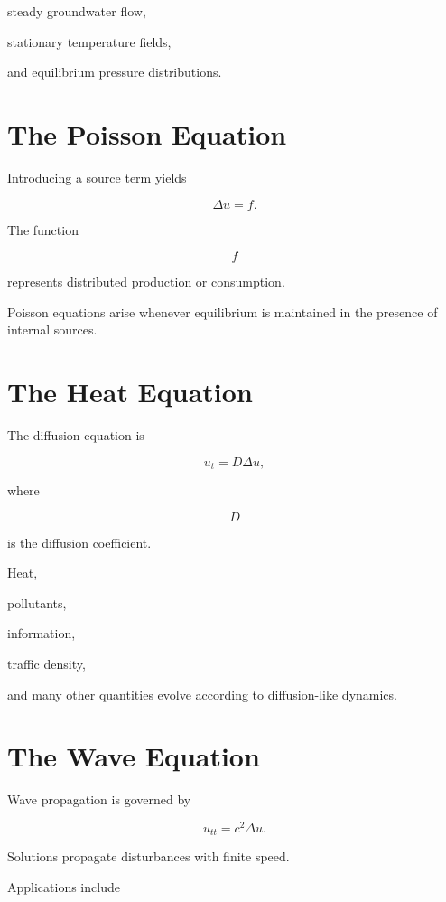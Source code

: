 \documentclass[11pt,fleqn]{book}
\numberwithin{equation}{chapter}
\theoremstyle{plain}
\theoremstyle{definition}
\theoremstyle{remark}
\begin{document}
steady groundwater flow,

stationary temperature fields,

and equilibrium pressure distributions.


\section{The Poisson Equation}

Introducing a source term yields

\[
\boxed{
\Delta u
=
f.
}
\]

The function

\[
f
\]

represents distributed production or consumption.

Poisson equations arise whenever equilibrium is maintained in the
presence of internal sources.


\section{The Heat Equation}

The diffusion equation is

\[
\boxed{
u_t
=
D
\Delta u,
}
\]

where

\[
D
\]

is the diffusion coefficient.

Heat,

pollutants,

information,

traffic density,

and many other quantities evolve according to diffusion-like dynamics.


\section{The Wave Equation}

Wave propagation is governed by

\[
\boxed{
u_{tt}
=
c^2
\Delta u.
}
\]

Solutions propagate disturbances with finite speed.

Applications include
\end{document}
